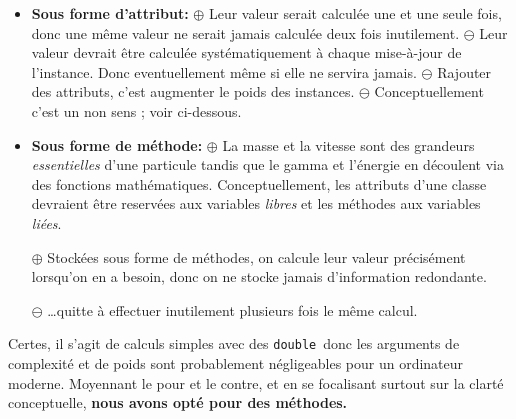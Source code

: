 \documentclass[12pt, letterpaper, twoside]{article}
\newcommand{\double}{\texttt{double}}
\begin{document}
\begin{itemize}

\item \textbf{Sous forme d'attribut:}
\subitem $\oplus$ Leur valeur serait calculée une et une seule fois, donc une même valeur ne serait jamais calculée deux fois inutilement.
\subitem $\ominus$ Leur valeur devrait être calculée systématiquement à chaque mise-à-jour de l'instance. Donc eventuellement même si elle ne servira jamais.
\subitem $\ominus$ Rajouter des attributs, c'est augmenter le poids des instances.
\subitem $\ominus$ Conceptuellement c'est un non sens ; voir ci-dessous.

\item \textbf{Sous forme de méthode:}
\subitem $\oplus$ La masse et la vitesse sont des grandeurs \textit{essentielles} d'une particule tandis que le gamma et l'énergie en découlent via des fonctions mathématiques. Conceptuellement, les attributs d'une classe devraient être reservées aux variables \textit{libres} et les méthodes aux variables \textit{liées}.

\subitem $\oplus$ Stockées sous forme de méthodes, on calcule leur valeur précisément lorsqu'on en a besoin, donc on ne stocke jamais d'information redondante.

\subitem $\ominus$ \ldots quitte à effectuer inutilement plusieurs fois le même calcul.
\end{itemize}
\bigskip
Certes, il s'agit de calculs simples avec des \double\ donc les arguments de complexité et de poids sont probablement négligeables pour un ordinateur moderne. Moyennant le pour et le contre, et en se focalisant surtout sur la clarté conceptuelle, \textbf{nous avons opté pour des méthodes.}
\end{document}
